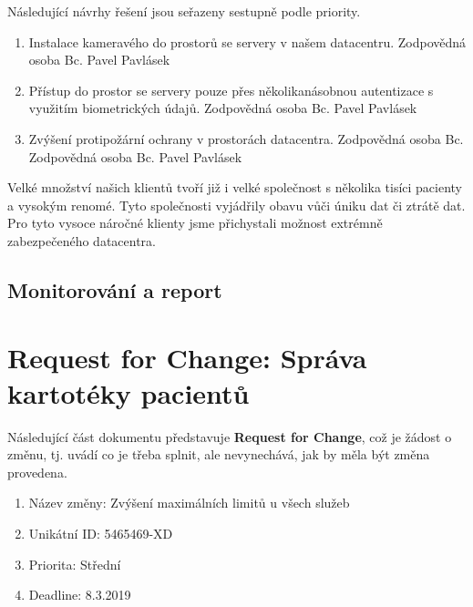\documentclass[11pt, a4paper, titlepage]{article}
\begin{document}
	Následující návrhy řešení jsou seřazeny sestupně podle priority.

	\begin{enumerate}
		\item Instalace kameravého do prostorů se servery v našem datacentru. Zodpovědná osoba Bc. Pavel Pavlásek
		\item Přístup do prostor se servery pouze přes několikanásobnou autentizace s využitím biometrických údajů. Zodpovědná osoba Bc. Pavel Pavlásek
		\item Zvýšení protipožární ochrany v prostorách datacentra. Zodpovědná osoba Bc. Zodpovědná osoba Bc. Pavel Pavlásek
	\end{enumerate}

	Velké množství našich klientů tvoří již i velké společnost s několika tisíci pacienty a vysokým renomé. Tyto společnosti vyjádřily obavu vůči úniku dat či ztrátě dat. Pro tyto vysoce náročné klienty jsme přichystali možnost extrémně zabezpečeného datacentra.

	\subsection{Monitorování a report}

	\section*{Request for Change: Správa kartotéky pacientů}

	\vspace{0.5em}

	\noindent\makebox[\linewidth]{\rule{17.5cm}{0.4pt}}

	\vspace{0.5em}

	\noindent Následující část dokumentu představuje \textbf{Request for Change}, což je žádost o změnu, tj. uvádí co je třeba splnit, ale nevynechává, jak by měla být změna provedena.

	\noindent\makebox[\linewidth]{\rule{17.5cm}{0.4pt}}

	\begin{enumerate}
		\item Název změny: Zvýšení maximálních limitů u všech služeb
		\item Unikátní ID: 5465469-XD
		\item Priorita:	Střední
		\item Deadline: 8.3.2019
	\end{enumerate}
\end{document}

